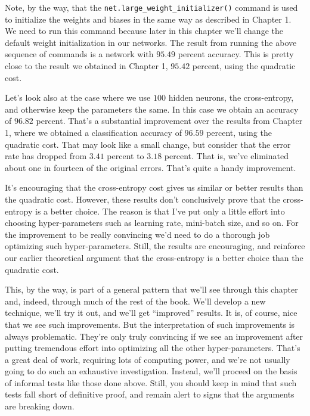 Note, by the way, that the \texttt{net.large\_\allowbreak{}weight\_\allowbreak{}initializer()} command is used to initialize the weights and biases in the same way as described in Chapter 1. We need to run this command because later in this chapter we'll change the default weight initialization in our networks. The result from running the above sequence of commands is a network with $95.49$ percent accuracy. This is pretty close to the result we obtained in Chapter 1, $95.42$ percent, using the quadratic cost.


Let's look also at the case where we use $100$ hidden neurons, the cross-entropy, and otherwise keep the parameters the same. In this case we obtain an accuracy of $96.82$ percent. That's a substantial improvement over the results from Chapter 1, where we obtained a classification accuracy of $96.59$ percent, using the quadratic cost. That may look like a small change, but consider that the error rate has dropped from $3.41$ percent to $3.18$ percent. That is, we've eliminated about one in fourteen of the original errors. That's quite a handy improvement.


It's encouraging that the cross-entropy cost gives us similar or better results than the quadratic cost. However, these results don't conclusively prove that the cross-entropy is a better choice. The reason is that I've put only a little effort into choosing hyper-parameters such as learning rate, mini-batch size, and so on. For the improvement to be really convincing we'd need to do a thorough job optimizing such hyper-parameters. Still, the results are encouraging, and reinforce our earlier theoretical argument that the cross-entropy is a better choice than the quadratic cost.


This, by the way, is part of a general pattern that we'll see through this chapter and, indeed, through much of the rest of the book. We'll develop a new technique, we'll try it out, and we'll get ``improved'' results. It is, of course, nice that we see such improvements. But the interpretation of such improvements is always problematic. They're only truly convincing if we see an improvement after putting tremendous effort into optimizing all the other hyper-parameters. That's a great deal of work, requiring lots of computing power, and we're not usually going to do such an exhaustive investigation. Instead, we'll proceed on the basis of informal tests like those done above. Still, you should keep in mind that such tests fall short of definitive proof, and remain alert to signs that the arguments are breaking down.


